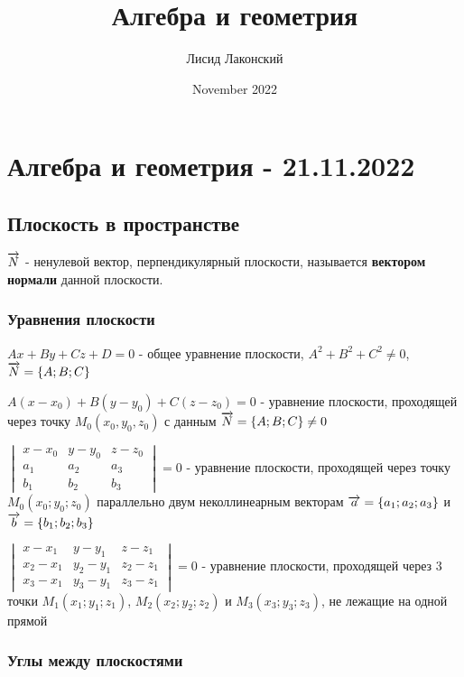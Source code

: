\documentclass{article}
\title{Алгебра и геометрия}
\author{Лисид Лаконский}
\date{November 2022}
\def\vec{\ensuremath\overrightarrow}
\begin{document}
\maketitle

\tableofcontents
\pagebreak

\section{Алгебра и геометрия - 21.11.2022}

\subsection{Плоскость в пространстве}

\begin{flushleft}

$\vec{N}$ - ненулевой вектор, перпендикулярный плоскости, называется \textbf{вектором нормали} данной плоскости.

\subsubsection{Уравнения плоскости}

$Ax + By + C z + D = 0$ - общее уравнение плоскости, $A^2 + B^2 + C^2 \ne 0$, $\vec{N} = \{ A; B; C \}$

$A(x - x_0) + B(y - y_0) + C(z - z_0) = 0$ - уравнение плоскости, проходящей через точку $M_0(x_0, y_0, z_0)$ с данным $\vec{N} = \{ A; B; C \} \ne 0$ 


$\begin{vmatrix}
    x - x_0 & y - y_0 & z - z_0 \\
    a_1 & a_2 & a_3 \\
    b_1 & b_2 & b_3
\end{vmatrix} = 0$ - 
уравнение плоскости, проходящей через точку $M_0(x_0; y_0; z_0)$ параллельно двум неколлинеарным векторам $\vec{a} = \{ a_1; a_2; a_3 \}$ и $\vec{b} = \{ b_1; b_2; b_3 \}$

$\begin{vmatrix}
    x - x_1 & y - y_1 & z - z_1 \\
    x_2 - x_1 & y_2 - y_1 & z_2 - z_1 \\
    x_3 - x_1 & y_3 - y_1 & z_3 - z_1
\end{vmatrix} = 0$ - уравнение плоскости, проходящей через 3 точки $M_1(x_1; y_1; z_1)$, $M_2(x_2; y_2; z_2)$ и $M_3(x_3; y_3; z_3)$, не лежащие на одной прямой

\subsubsection{Углы между плоскостями}


\end{flushleft}
\end{document}
